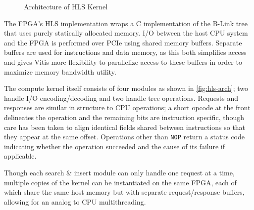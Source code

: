 \label{subsec:fpga-implementation}

\begin{figure}[h]
	\centering
	
	\caption{Architecture of HLS Kernel}
	\label{fig:hls-arch}
\end{figure}

The FPGA's HLS implementation wraps a C implementation of the B-Link tree that
uses purely statically allocated memory. I/O between the host CPU system and the
FPGA is performed over PCIe using shared memory buffers. Separate buffers are
used for instructions and data memory, as this both simplifies access and gives
Vitis more flexibility to parallelize access to these buffers in order to
maximize memory bandwidth utility.

The compute kernel itself consists of four modules as shown in
\autoref{fig:hls-arch}; two handle I/O encoding/decoding and two handle tree
operations. Requests and responses are similar in structure to CPU operations; a
short opcode at the front delineates the operation and the remaining bits are
instruction specific, though care has been taken to align identical fields
shared between instructions so that they appear at the same offset. Operations
other than \texttt{NOP} return a status code indicating whether the operation
succeeded and the cause of its failure if applicable.

Though each search \& insert module can only handle one request at a time,
multiple copies of the kernel can be instantiated on the same FPGA, each of
which share the same host memory but with separate request/response buffers,
allowing for an analog to CPU multithreading.
